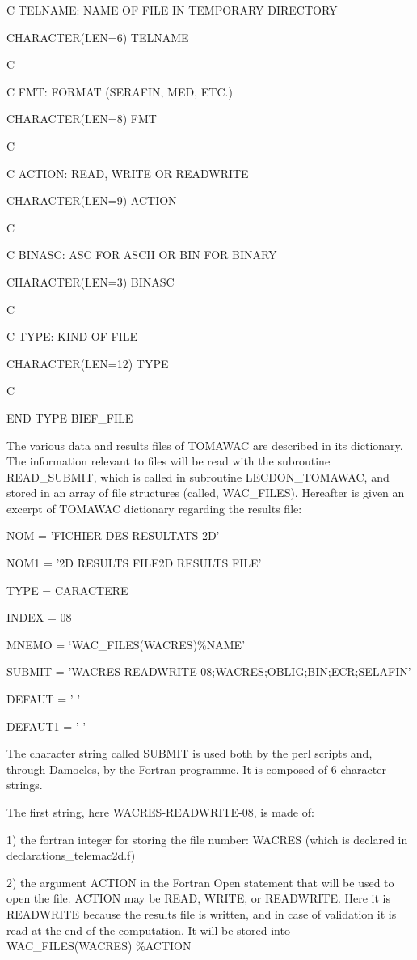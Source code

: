  C   TELNAME: NAME OF FILE IN TEMPORARY DIRECTORY

    CHARACTER(LEN=6) TELNAME

 C

 C   FMT: FORMAT (SERAFIN, MED, ETC.)

    CHARACTER(LEN=8) FMT

 C

 C   ACTION: READ, WRITE OR READWRITE

    CHARACTER(LEN=9) ACTION

 C

 C   BINASC: ASC FOR ASCII OR BIN FOR BINARY

    CHARACTER(LEN=3) BINASC

 C

 C   TYPE: KIND OF FILE

    CHARACTER(LEN=12) TYPE

 C

   END TYPE BIEF\_FILE

 \textbf{}

 The various data and results files of TOMAWAC are described in its dictionary. The information relevant to files will be read with the subroutine READ\_SUBMIT, which is called in subroutine LECDON\_TOMAWAC, and stored in an array of file structures (called, WAC\_FILES). Hereafter is given an excerpt of TOMAWAC dictionary regarding the results file:

 NOM = 'FICHIER DES RESULTATS 2D'

 NOM1 = '2D RESULTS FILE2D RESULTS FILE'

 TYPE = CARACTERE

 INDEX = 08

 MNEMO = `WAC\_FILES(WACRES)\%NAME'

 SUBMIT = 'WACRES-READWRITE-08;WACRES;OBLIG;BIN;ECR;SELAFIN'

 DEFAUT = ' '

 DEFAUT1 = ' '

 The character string called SUBMIT is used both by the perl scripts and, through Damocles, by the Fortran programme. It is composed of 6 character strings.

 The first string, here WACRES-READWRITE-08, is made of:

 1) the fortran integer for storing the file number: WACRES (which is declared in declarations\_telemac2d.f)

 2) the argument ACTION in the Fortran Open statement that will be used to open the file. ACTION may be READ, WRITE, or READWRITE. Here it is READWRITE because the results file is written, and in case of validation it is read at the end of the computation. It will be stored into WAC\_FILES(WACRES) \%ACTION


